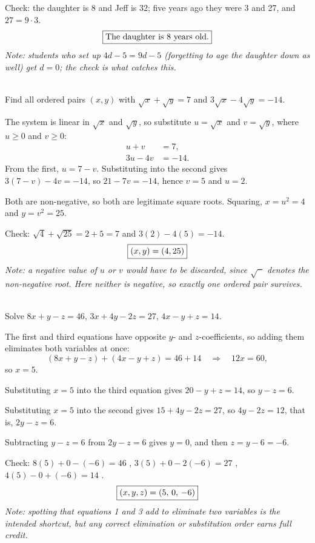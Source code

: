\documentclass[11pt]{article}
\begin{document}
\begin{questions}
\begin{solution}
    Check: the daughter is 8 and Jeff is 32; five years ago they were 3 and 27, and
    $27 = 9 \cdot 3$. \checkmark
    \[ \fbox{$\displaystyle \text{The daughter is } 8 \text{ years old.}$} \]
    \textit{Note: students who set up $4d - 5 = 9d - 5$ (forgetting to age the daughter
    down as well) get $d = 0$; the check is what catches this.}
  \end{solution}

\item {}\\
  Find all ordered pairs $(x,y)$ with $\sqrt{x} + \sqrt{y} = 7$ and
  $3\sqrt{x} - 4\sqrt{y} = -14$.
  \begin{solution}
    The system is linear in $\sqrt{x}$ and $\sqrt{y}$, so substitute
    $u = \sqrt{x}$ and $v = \sqrt{y}$, where $u \ge 0$ and $v \ge 0$:
    \[
      \begin{aligned}
        u + v &= 7,\\
        3u - 4v &= -14.
      \end{aligned}
    \]
    From the first, $u = 7 - v$. Substituting into the second gives
    $3(7 - v) - 4v = -14$, so $21 - 7v = -14$, hence $v = 5$ and $u = 2$.

    Both are non-negative, so both are legitimate square roots. Squaring,
    $x = u^2 = 4$ and $y = v^2 = 25$.

    Check: $\sqrt{4} + \sqrt{25} = 2 + 5 = 7$ and $3(2) - 4(5) = -14$. \checkmark
    \[ \fbox{$\displaystyle (x,y) = (4,25)$} \]
    \textit{Note: a negative value of $u$ or $v$ would have to be discarded, since
    $\sqrt{\phantom{x}}$ denotes the non-negative root. Here neither is negative, so
    exactly one ordered pair survives.}
  \end{solution}

\item {}\\
  Solve $8x + y - z = 46$, \; $3x + 4y - 2z = 27$, \; $4x - y + z = 14$.
  \begin{solution}
    The first and third equations have opposite $y$- and $z$-coefficients, so adding them
    eliminates both variables at once:
    \[ (8x + y - z) + (4x - y + z) = 46 + 14 \quad\Longrightarrow\quad 12x = 60, \]
    so $x = 5$.

    Substituting $x = 5$ into the third equation gives $20 - y + z = 14$, so $y - z = 6$.

    Substituting $x = 5$ into the second gives $15 + 4y - 2z = 27$, so $4y - 2z = 12$,
    that is, $2y - z = 6$.

    Subtracting $y - z = 6$ from $2y - z = 6$ gives $y = 0$, and then $z = y - 6 = -6$.

    Check: $8(5) + 0 - (-6) = 46$ \checkmark, \;
    $3(5) + 0 - 2(-6) = 27$ \checkmark, \;
    $4(5) - 0 + (-6) = 14$ \checkmark.
    \[ \fbox{$\displaystyle (x,y,z) = (5,\,0,\,-6)$} \]
    \textit{Note: spotting that equations 1 and 3 add to eliminate two variables is the
    intended shortcut, but any correct elimination or substitution order earns full credit.}
  \end{solution}

\end{questions}
\end{document}
